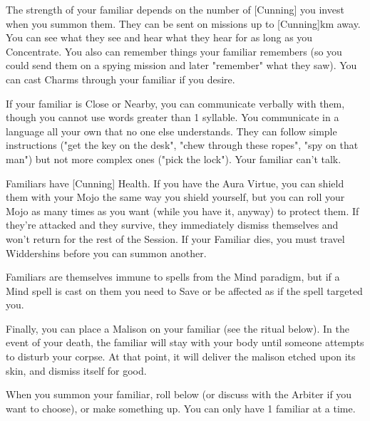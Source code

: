 {The strength of your familiar depends on the number of [Cunning] you invest when you summon them.  They can be sent on missions up to [Cunning]km away. You can see what they see and hear what they hear for as long as you Concentrate. You also can remember things your familiar remembers (so you could send them on a spying mission and later "remember" what they saw). You can cast Charms through your familiar if you desire.

If your familiar is Close or Nearby, you can communicate verbally with them, though you cannot use words greater than 1 syllable.  You communicate in a language all your own that no one else understands.  They can follow simple instructions ("get the key on the desk", "chew through these ropes", "spy on that man") but not more complex ones ("pick the lock").  Your familiar can't talk.

Familiars have [Cunning] Health.  If you have the Aura Virtue, you can shield them with your Mojo the same way you shield yourself, but you can roll your Mojo as many times as you want (while you have it, anyway) to protect them.  If they're attacked and they survive, they immediately dismiss themselves and won't return for the rest of the Session. If your Familiar dies, you must travel Widdershins before you can summon another.  

Familiars are themselves immune to spells from the Mind paradigm, but if a Mind spell is cast on them you need to Save or be affected as if the spell targeted you.

Finally, you can place a Malison on your familiar (see the ritual below).  In the event of your death, the familiar will stay with your body until someone attempts to disturb your corpse.  At that point, it will deliver the malison etched upon its skin, and dismiss itself for good.

When you summon your familiar, roll below (or discuss with the Arbiter if you want to choose), or make something up.  You can only have 1 familiar at a time.





}
